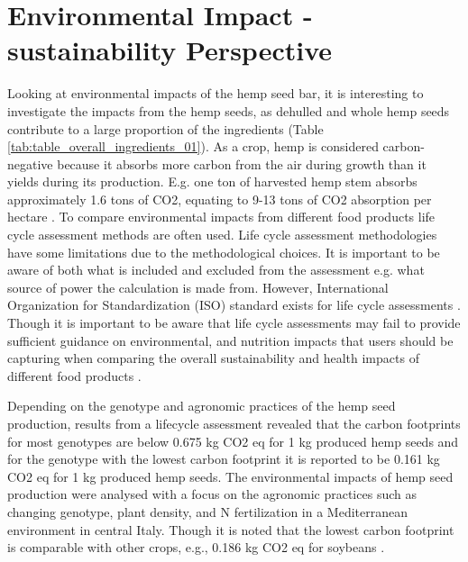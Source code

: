 \section{Environmental Impact - sustainability Perspective}
Looking at environmental impacts of the hemp seed bar, it is interesting to investigate the impacts from the hemp seeds, as dehulled and whole hemp seeds contribute to a large proportion of the ingredients (Table \ref*{tab:table_overall_ingredients_01}). As a crop, hemp is considered carbon-negative because it absorbs more carbon from the air during growth than it yields during its production. E.g. one ton of harvested hemp stem absorbs approximately 1.6 tons of CO2, equating to 9-13 tons of CO2 absorption per hectare \cite*{HempBook,montero2023hemp}. To compare environmental impacts from different food products life cycle assessment methods are often used. Life cycle assessment methodologies have some limitations due to the methodological choices. It is important to be aware of both what is included and excluded from the assessment e.g. what source of power the calculation is made from. However, International Organization for Standardization (ISO) standard exists for life cycle assessments \cite*{Bjorn2017GoalDefinition}. Though it is important to be aware that life cycle assessments may fail to provide sufficient guidance on environmental, and nutrition impacts that users should be capturing when comparing the overall sustainability and health impacts of different food products \cite*{McLaren2021IntegrationEnvNutritionLCA}.

\vspace{1em}
Depending on the genotype and agronomic practices of the hemp seed production, results from a lifecycle assessment revealed that the carbon footprints for most genotypes are below 0.675 kg CO2 eq for 1 kg produced hemp seeds and for the genotype with the lowest carbon footprint it is reported to be 0.161 kg CO2 eq for 1 kg produced hemp seeds. The environmental impacts of hemp seed production were analysed with a focus on the agronomic practices such as changing genotype, plant density, and N fertilization in a Mediterranean environment in central Italy. Though it is noted that the lowest carbon footprint is comparable with other crops, e.g., 0.186 kg CO2 eq for soybeans \cite*{Campiglia2020HempSeedProductionLCA}.

